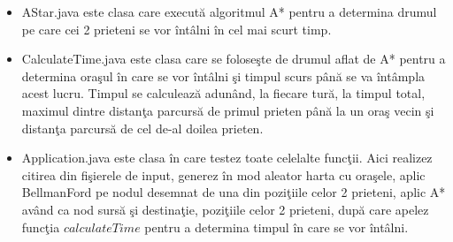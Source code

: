 \documentclass{article}
\begin{document}
\begin{itemize}
    \item AStar.java este clasa care execut\u{a} algoritmul A* pentru a determina drumul pe care cei 2 prieteni se vor \^{i}nt\^{a}lni \^{i}n cel mai scurt timp.
    \item CalculateTime.java este clasa care se folose\c{s}te de drumul aflat de A* pentru a determina ora\c{s}ul \^{i}n care se vor \^{i}nt\^{a}lni \c{s}i timpul scurs p\^{a}n\u{a} se va \^{i}nt\^{a}mpla acest lucru. Timpul se calculeaz\u{a} adun\^{a}nd, la fiecare tur\u{a}, la timpul total, maximul dintre distan\c{t}a parcurs\u{a} de primul prieten p\^{a}n\u{a} la un ora\c{s} vecin \c{s}i distan\c{t}a parcurs\u{a} de cel de-al doilea prieten.
    \item Application.java este clasa \^{i}n care testez toate celelalte func\c{t}ii. Aici realizez citirea din fi\c{s}ierele de input, generez \^{i}n mod aleator harta cu ora\c{s}ele, aplic BellmanFord pe nodul desemnat de una din pozi\c{t}iile celor 2 prieteni, aplic A* av\^{a}nd ca nod surs\u{a} \c{s}i destina\c{t}ie, pozi\c{t}iile celor 2 prieteni, dup\u{a} care apelez func\c{t}ia $calculateTime$ pentru a determina timpul \^{i}n care se vor \^{i}nt\^{a}lni.
\end{itemize}
\end{document}
